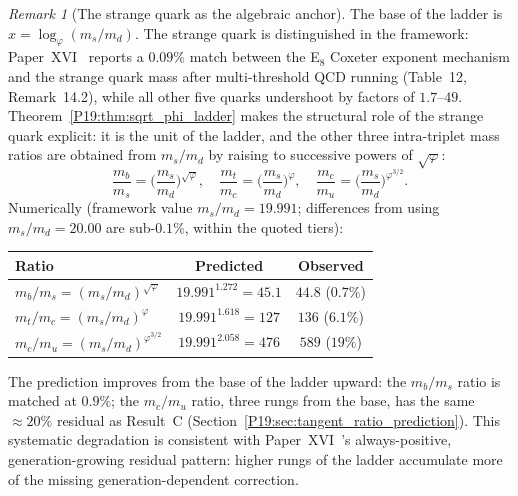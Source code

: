 \documentclass[11pt,a4paper]{article}
\theoremstyle{definition}\newtheorem{definition}[theorem]{Definition}
\theoremstyle{remark}
\newtheorem{remark}[theorem]{Remark}
\newcommand{\vp}{\varphi}
\begin{document}
\begin{remark}[The strange quark as the algebraic anchor]
\label{P19:rem:strange_anchor}
The base of the ladder is $x=\log_\vp(m_s/m_d)$.  The strange
quark is distinguished in the framework: Paper~XVI~\cite{Paper16}
reports a $0.09\%$ match between the E$_8$ Coxeter
exponent mechanism and the strange quark mass after multi-threshold
QCD running (Table~12, Remark~14.2), %
while all other five quarks undershoot by factors of $1.7$--$49$.
Theorem~\ref{P19:thm:sqrt_phi_ladder} makes the structural role of
the strange quark explicit: it is the unit of the ladder, and the
other three intra-triplet mass ratios are obtained from
$m_s/m_d$ by raising to successive powers of $\sqrt{\vp}$:
\begin{equation}
  \frac{m_b}{m_s}=\biggl(\frac{m_s}{m_d}\biggr)^{\!\sqrt{\vp}},
  \quad
  \frac{m_t}{m_c}=\biggl(\frac{m_s}{m_d}\biggr)^{\!\vp},
  \quad
  \frac{m_c}{m_u}=\biggl(\frac{m_s}{m_d}\biggr)^{\!\vp^{3/2}}.
  \label{P19:eq:strange_anchor_predictions}
\end{equation}
Numerically (framework value $m_s/m_d=19.991$; differences from
using $m_s/m_d=20.00$ are sub-$0.1\%$, within the quoted tiers):
\begin{center}
\begin{tabular}{lcc}
\toprule
Ratio & Predicted & Observed\\
\midrule
$m_b/m_s=(m_s/m_d)^{\sqrt{\vp}}$
  & $19.991^{1.272}=45.1$ & $44.8$ ($0.7\%$)\\
$m_t/m_c=(m_s/m_d)^{\vp}$
  & $19.991^{1.618}=127$ & $136$ ($6.1\%$)\\
$m_c/m_u=(m_s/m_d)^{\vp^{3/2}}$
  & $19.991^{2.058}=476$ & $589$ ($19\%$)\\
\bottomrule
\end{tabular}
\end{center}
The prediction improves from the base of the ladder upward: the
$m_b/m_s$ ratio is matched at $0.9\%$; the $m_c/m_u$ ratio, three
rungs from the base, has the same $\approx20\%$ residual as
Result~C (Section~\ref{P19:sec:tangent_ratio_prediction}).  This
systematic degradation is consistent with Paper~XVI~\cite{Paper16}'s
always-positive, generation-growing residual pattern: higher rungs
of the ladder accumulate more of the missing generation-dependent
correction.
\end{remark}
\end{document}
